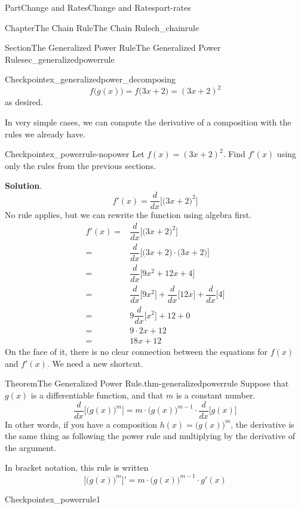 \documentclass[oneside,10pt,]{tufte-book}
\newcommand{\blocktitlefont}{\relax}
\numberwithin{equation}{chapter}
\newcommand{\ddx}[1]{ \dfrac{d}{dx} \Big[ #1 \Big]  }
\newcommand{\D}[1]{ \Big[ #1 \Big]'  }
\newcommand{\amp}{&}
\begin{document}
\begin{partptx}{Part}{Change and Rates}{}{Change and Rates}{}{}{part-rates}
\begin{chapterptx}{Chapter}{The Chain Rule}{}{The Chain Rule}{}{}{ch_chainrule}
\begin{sectionptx}{Section}{The Generalized Power Rule}{}{The Generalized Power Rule}{}{}{sec_generalizedpowerrule}
\begin{inlineexercise}{Checkpoint}{}{ex_generalizedpower_decomposing}
\begin{equation*}
f\Big(g(x)\Big) = f\Big(3x+2\Big) = (3x+2)^2
\end{equation*}
as desired.%
\end{inlineexercise}%
In very simple cases, we can compute the derivative of a composition with the rules we already have.%
\begin{inlineexercise}{Checkpoint}{}{ex_powerrule-nopower}%
Let \(f(x) = (3x+2)^2\).  Find \(f'(x)\) using only the rules from the previous sections.%
\par\smallskip%
\noindent\textbf{\blocktitlefont Solution}.\hypertarget{ex_powerrule-nopower-2}{}\quad{}%
\begin{equation*}
f'(x) = \ddx{ \Big(3x+2\Big)^2 } 
\end{equation*}
No rule applies, but we can rewrite the function using algebra first.%
\begin{align*}
f'(x) = \amp  \ddx{ \Big(3x+2\Big)^2 } \\
= \amp \ddx{  \Big(3x+2\Big)\cdot  \Big(3x+2\Big) }\\
= \amp \ddx{  9x^2 + 12x + 4 }\\
= \amp \ddx{9x^2} + \ddx{12x} + \ddx{4} \\
= \amp 9\ddx{x^2} + 12 + 0 \\
= \amp 9\cdot 2x + 12  \\
= \amp 18x + 12  
\end{align*}
On the face of it, there is no clear connection between the equations for \(f(x)\) and \(f'(x)\). We need a new shortcut.%
\end{inlineexercise}%
\begin{theorem}{Theorem}{The Generalized Power Rule.}{}{thm-generalizedpowerrule}%
Suppose that \(g(x)\) is a differentiable function, and that \(m\) is a constant number.%
\begin{equation*}
\ddx{ \Big( g(x) \Big)^m} = m\cdot \Big( g(x) \Big)^{m-1} \cdot \ddx{g(x)} 
\end{equation*}
In other words, if you have a composition \(h(x) = \Big(g(x)\Big)^m\), the derivative is the same thing as following the power rule and multiplying by the derivative of the argument.%
\par
In bracket notation, this rule is written%
\begin{equation*}
\D{ \Big(g(x)\Big)^m } = m\cdot \Big(g(x)\Big)^{m-1}\cdot g'(x)
\end{equation*}
%
\end{theorem}
\begin{inlineexercise}{Checkpoint}{}{ex_powerrule1}%

\end{inlineexercise}
\end{sectionptx}
\end{chapterptx}
\end{partptx}
\end{document}
